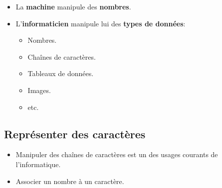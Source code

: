 \begin{slide}
  \begin{itemize}
    \item La \textbf{machine} manipule des \textbf{nombres}.
    \item L'\textbf{informaticien} manipule lui des \textbf{types de données}:
      \begin{itemize}
	\item Nombres.
	\item Chaînes de caractères.
	\item Tableaux de données.
	\item Images.
	\item etc. 
      \end{itemize}
  \end{itemize}
\end{slide}

\subsection{Représenter des caractères}
\begin{slide}
  \begin{itemize}
    \item Manipuler des chaînes de caractères est un des usages courants de l'informatique.
    \item Associer un nombre à un caractère.
  \end{itemize}
\end{slide}

